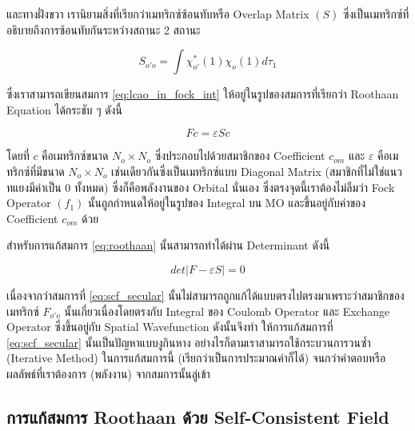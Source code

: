 \noindent และทางฝั่งขวา เรานิยามสิ่งที่เรียกว่าเมทริกซ์ซ้อนทับหรือ Overlap Matrix $(S)$ ซึ่งเป็นเมทริกซ์ที่อธิบายถึงการซ้อนทับกันระหว่างสถานะ
2 สถานะ

\begin{equation}\label{eq:matrix_overlap}
    S_{o'o} = \int \chi^{*}_{o'}(1) \chi_{o}(1) d\tau_{1}
\end{equation}

\noindent ซึ่งเราสามารถเขียนสมการ \eqref{eq:lcao_in_fock_int} ให้อยู่ในรูปของสมการที่เรียกว่า Roothaan Equation ได้กระชับ ๆ ดังนี้

\begin{equation}\label{eq:roothaan}
    F c = \varepsilon S c
\end{equation}

\noindent โดยที่ $c$ คือเมทริกซ์ขนาด $N_{o} \times N_{o}$ ซึ่งประกอบไปด้วยสมาชิกของ Coefficient $c_{om}$ และ $\varepsilon$
คือเมทริกซ์ที่มีขนาด $N_{o} \times N_{o}$ เช่นเดียวกันซึ่งเป็นเมทริกซ์แบบ Diagonal Matrix (สมาชิกที่ไม่ใช่แนวทแยงมีค่าเป็น 0 ทั้งหมด)
ซึ่งก็คือพลังงานของ Orbital นั่นเอง ซึ่งตรงจุดนี้เราต้องไม่ลืมว่า Fock Operator $(f_{1})$ นั้นถูกกำหนดให้อยู่ในรูปของ Integral บน MO
และขึ้นอยู่กับค่าของ Coefficient $c_{om}$ ด้วย

สำหรับการแก้สมการ \eqref{eq:roothaan} นั้นสามารถทำได้ผ่าน Determinant ดังนี้

\begin{equation}\label{eq:scf_secular}
    det|F - \varepsilon S| = 0
\end{equation}

\noindent เนื่องจากว่าสมการที่ \eqref{eq:scf_secular} นั้นไม่สามารถถูกแก้ได้แบบตรงไปตรงมาเพราะว่าสมาชิกของเมทริกซ์ $F_{o'o}$
นั้นเกี่ยวเนื่องโดยตรงกับ Integral ของ Coulomb Operator และ Exchange Operator ซึ่งขึ้นอยู่กับ Spatial Wavefunction ดังนั้นจึงทำ%
ให้การแก้สมการที่ \eqref{eq:scf_secular} นั้นเป็นปัญหาแบบงูกินหาง อย่างไรก็ตามเราสามารถใช้กระบวนการวนซ้ำ (Iterative Method)
ในการแก้สมการนี้ (เรียกว่าเป็นการประมาณค่าก็ได้) จนกว่าคำตอบหรือผลลัพธ์ที่เราต้องการ (พลังงาน) จากสมการนั้นลู่เข้า

\subsection{การแก้สมการ Roothaan ด้วย Self-Consistent Field}
\label{ssec:roothaan_scf}

